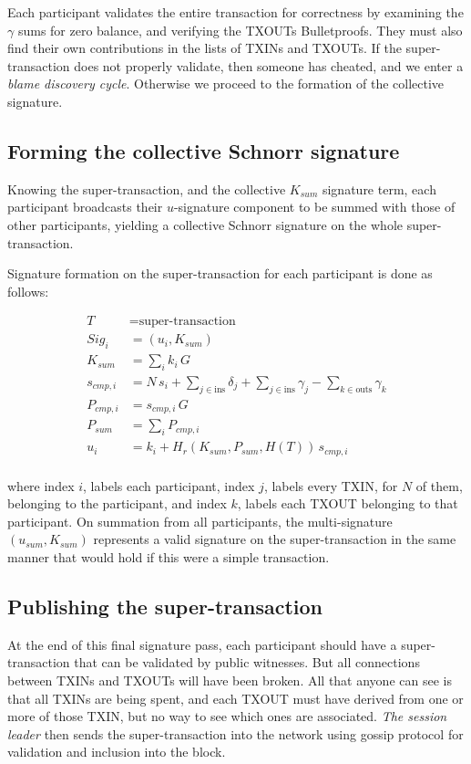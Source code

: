 \documentclass[8pt,fleqn,openany]{book}
\begin{document}
{		Each participant validates the entire transaction for correctness by examining the $\gamma$ sums for zero balance, and verifying the TXOUTs Bulletproofs. They must also find their own contributions in the lists of TXINs and TXOUTs. If the super-transaction does not properly validate, then someone has cheated, and we enter a \textit{blame discovery cycle}. Otherwise we proceed to the formation of the collective signature. 
		
		\subsection{Forming the collective Schnorr signature} 
		Knowing the super-transaction, and the collective $K_{sum}$ signature term, each participant broadcasts their $u$-signature component to be summed with those of other participants, yielding a collective Schnorr signature on the whole super-transaction.
		
		Signature formation on the super-transaction for each participant is done as follows:
		
		\begin{align*}
		T &= \text{super-transaction} \\
		Sig_i &= (u_i, K_{sum}) \\
		K_{sum} &= \sum_i{k_i \, G} \\
		s_{cmp,i} &= N \, s_i + \sum_{j \in \text{ins}} {\delta_j} + \sum_{j \in \text{ins}} {\gamma_j} - \sum_{k \in \text{outs}} {\gamma_k} \\
		P_{cmp,i} &= s_{cmp,i} \, G \\
		P_{sum} &= \sum_i{P_{cmp,i}}\\
		u_i &= k_i + H_r(K_{sum} , P_{sum},  H(T)) \,  s_{cmp,i}\\
		\end{align*}
		
		where index $i$, labels each participant, index $j$, labels every TXIN, for $N$ of them, belonging to the participant, and index $k$, labels each TXOUT belonging to that participant. On summation from all participants, the multi-signature $(u_{sum}, K_{sum})$ represents a valid signature on the super-transaction in the same manner that would hold if this were a simple transaction.
		
		\subsection{Publishing the super-transaction} 
		At the end of this final signature pass, each participant should have a super-transaction that can be validated by public witnesses. But all connections between TXINs and TXOUTs will have been broken. All that anyone can see is that all TXINs are being spent, and each TXOUT must have derived from one or more of those TXIN, but no way to see which ones are associated. \textit{The session leader} then sends the super-transaction into the network using gossip protocol for validation and inclusion into the block.
		
}
\end{document}
